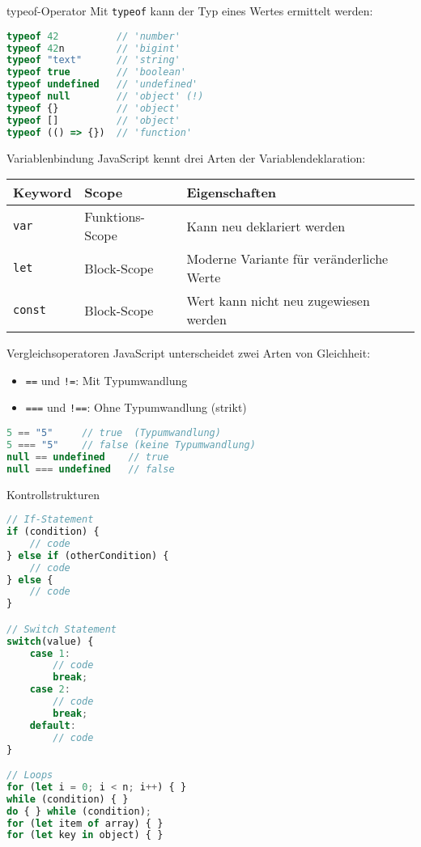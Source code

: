 \begin{KR}{typeof-Operator}
Mit \texttt{typeof} kann der Typ eines Wertes ermittelt werden:
\begin{lstlisting}[language=JavaScript, style=basesmol]
typeof 42          // 'number'
typeof 42n         // 'bigint'
typeof "text"      // 'string'
typeof true        // 'boolean'
typeof undefined   // 'undefined'
typeof null        // 'object' (!)
typeof {}          // 'object'
typeof []          // 'object'
typeof (() => {})  // 'function'
\end{lstlisting}
\end{KR}

\begin{theorem}{Variablenbindung}
    JavaScript kennt drei Arten der Variablendeklaration:
    \begin{center}
    \begin{tabular}{|l|l|l|}
        \hline
        Keyword & Scope & Eigenschaften \\ 
        \hline
        \texttt{var} & Funktions-Scope & Kann neu deklariert werden \\ 
        \hline
        \texttt{let} & Block-Scope & Moderne Variante für veränderliche Werte \\ 
        \hline
        \texttt{const} & Block-Scope & Wert kann nicht neu zugewiesen werden \\ 
        \hline
    \end{tabular}
    \end{center}
\end{theorem}

\begin{KR}{Vergleichsoperatoren}
    JavaScript unterscheidet zwei Arten von Gleichheit:
    \begin{itemize}
        \item \texttt{==} und \texttt{!=}: Mit Typumwandlung
        \item \texttt{===} und \texttt{!==}: Ohne Typumwandlung (strikt)
    \end{itemize}
\begin{lstlisting}[language=JavaScript, style=basesmol]
5 == "5"     // true  (Typumwandlung)
5 === "5"    // false (keine Typumwandlung)
null == undefined    // true
null === undefined   // false
\end{lstlisting}
\end{KR}

\begin{KR}{Kontrollstrukturen}
\begin{lstlisting}[language=JavaScript, style=basesmol]
// If-Statement
if (condition) {
    // code
} else if (otherCondition) {
    // code
} else {
    // code
}

// Switch Statement
switch(value) {
    case 1:
        // code
        break;
    case 2:
        // code
        break;
    default:
        // code
}

// Loops
for (let i = 0; i < n; i++) { }
while (condition) { }
do { } while (condition);
for (let item of array) { }
for (let key in object) { }
\end{lstlisting}
\end{KR}

